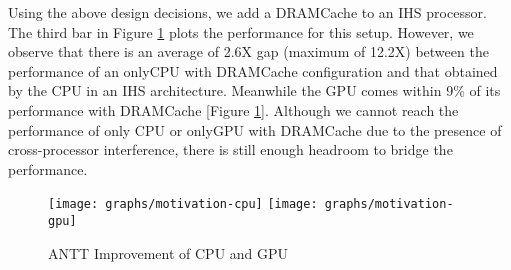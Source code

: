 \par Using the above design decisions, we add a DRAMCache to an IHS processor. The third bar in Figure \ref{fig:motivation} plots the performance for this setup. However, we observe that there is an average of 2.6X gap (maximum of 12.2X) between the performance of an onlyCPU with DRAMCache configuration and that obtained by the CPU in an IHS architecture. Meanwhile the GPU comes within 9\% of its performance with DRAMCache [Figure \ref{fig:motivation}]. Although we cannot reach the performance of only CPU or onlyGPU with DRAMCache due to the presence of cross-processor interference, there is still enough headroom to bridge the performance.
\begin{figure}[htbp]
   \texttt{[image: graphs/motivation-cpu]}
   \texttt{[image: graphs/motivation-gpu]}
   \caption{ANTT Improvement of CPU and GPU}
   \label{fig:motivation}
\end{figure}

